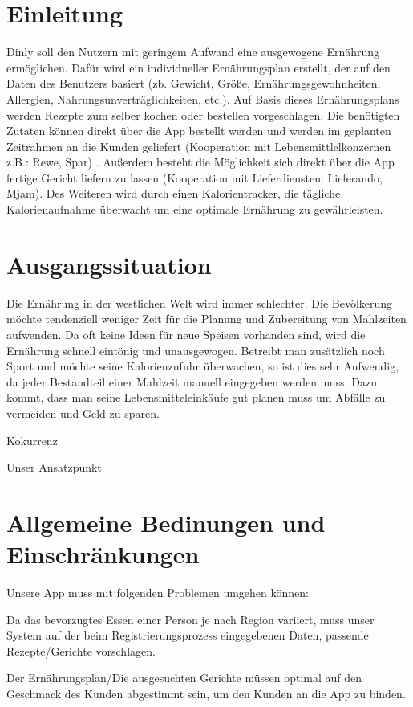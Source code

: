 \documentclass[12pt]{article}
\theoremstyle{definition}
\newcommand{\appname}{Dinly }
\begin{document}
\section{Einleitung}

\appname soll den Nutzern mit geringem Aufwand eine ausgewogene Ernährung ermöglichen. Dafür wird ein individueller Ernährungsplan erstellt, der auf den Daten des Benutzers basiert (zb. Gewicht, Größe, Ernährungsgewohnheiten, Allergien, Nahrungsunverträglichkeiten, etc.). Auf Basis dieses Ernährungsplans werden Rezepte zum selber kochen oder bestellen vorgeschlagen. Die benötigten Zutaten können direkt über die App bestellt werden und werden im geplanten Zeitrahmen an die Kunden geliefert (Kooperation mit Lebensmittlelkonzernen z.B.: Rewe, Spar) . Außerdem besteht die Möglichkeit sich direkt über die App fertige Gericht liefern zu lassen (Kooperation mit Lieferdiensten: Lieferando, Mjam). Des Weiteren wird durch einen Kalorientracker, die tägliche Kalorienaufnahme überwacht um eine optimale Ernährung zu gewährleisten.
\pagebreak

\section{Ausgangssituation}

Die Ernährung in der westlichen Welt wird immer schlechter. Die Bevölkerung möchte tendenziell weniger Zeit für die Planung und Zubereitung von Mahlzeiten aufwenden. Da oft keine Ideen für neue Speisen vorhanden sind, wird die Ernährung schnell eintönig und unausgewogen. Betreibt man zusätzlich noch Sport und möchte seine Kalorienzufuhr überwachen, so ist dies sehr Aufwendig, da jeder Bestandteil einer Mahlzeit manuell eingegeben werden muss. Dazu kommt, dass man seine Lebensmitteleinkäufe gut planen muss um Abfälle zu vermeiden und Geld zu sparen.

Kokurrenz

Unser Ansatzpunkt


\section{Allgemeine Bedinungen und Einschränkungen}
Unsere App muss mit folgenden Problemen umgehen können:

\baselineskip Da das bevorzugtes Essen einer Person je nach Region variiert, muss unser System auf der beim Registrierungsprozess eingegebenen Daten, passende Rezepte/Gerichte vorschlagen.

Der Ernährungsplan/Die ausgesuchten Gerichte müssen optimal auf den Geschmack des Kunden abgestimmt sein, um den Kunden an die App zu binden.
\end{document}
